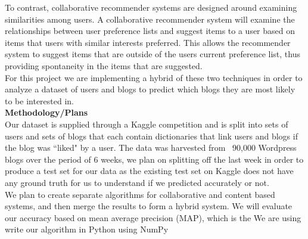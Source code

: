 \documentclass[12pt]{article} %
\begin{document}
To contrast, collaborative recommender systems are designed around examining similarities among users. A collaborative recommender system will examine the relationships between user preference lists and suggest items to a user based on items that users with similar interests preferred. This allows the recommender system to suggest items that are outside of the users current preference list, thus providing spontaneity in the items that are suggested.\\
For this project we are implementing a hybrid of these two techniques in order to analyze a dataset of users and blogs to predict which blogs they are most likely to be interested in. \\

\noindent \textbf{Methodology/Plans} \\
\noindent 
Our dataset is supplied through a Kaggle competition and is split into sets of users and sets of blogs that each contain dictionaries that link users and blogs if the blog was ``liked" by a user. The data was harvested from ~90,000 Wordpress blogs over the period of 6 weeks, we plan on splitting off the last week in order to produce a test set for our data as the existing test set on Kaggle does not have any ground truth for us to understand if we predicted accurately or not.\\
We plan to create separate algorithms for collaborative and content based systems, and then merge the results to form a hybrid system. We will evaluate our accuracy based on mean average precision (MAP), which is the  We are using   write our algorithm in Python using NumPy
\end{document}
